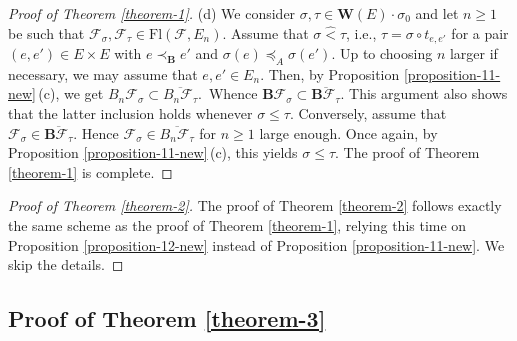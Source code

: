 \documentclass[12pt]{amsart}
\theoremstyle{definition}
\begin{document}
\begin{proof}[Proof of Theorem \ref{theorem-1}]
{\rm (d)}
We consider $\sigma,\tau\in\mathbf{W}(E)\cdot\sigma_0$
and let $n\geq 1$ be such that $\mathcal{F}_\sigma,\mathcal{F}_\tau\in\mathrm{Fl}(\mathcal{F},E_n)$.
Assume that $\sigma\hat{<}\tau$, i.e., $\tau=\sigma\circ t_{e,e'}$ for a pair $(e,e')\in E\times E$ with $e\prec_\mathbf{B}e'$ and $\sigma(e)\preceq_A\sigma(e')$. Up to choosing $n$ larger if necessary, we may assume that $e,e'\in E_n$. Then, by Proposition \ref{proposition-11-new}\,{\rm (c)}, we get $B_n\mathcal{F}_\sigma\subset\overline{B_n\mathcal{F}_\tau}$.\ Whence
$\mathbf{B}\mathcal{F}_\sigma\subset\overline{\mathbf{B}\mathcal{F}_\tau}$.
This argument also shows that the latter inclusion holds whenever $\sigma\leq\tau$.
Conversely, assume that $\mathcal{F}_\sigma\in\overline{\mathbf{B}\mathcal{F}_\tau}$.
Hence  $\mathcal{F}_\sigma\in\overline{B_n\mathcal{F}_\tau}$ for $n\geq 1$ large enough. Once again, by Proposition \ref{proposition-11-new}\,{\rm (c)}, this yields $\sigma\leq\tau$. The proof of Theorem \ref{theorem-1} is complete.
\end{proof}


\begin{proof}[Proof of Theorem \ref{theorem-2}]
The proof of Theorem \ref{theorem-2} follows exactly the same scheme as the proof of Theorem \ref{theorem-1}, relying this time on Proposition \ref{proposition-12-new} instead of Proposition \ref{proposition-11-new}.
We skip the details.
\end{proof}

\subsection{Proof of Theorem \ref{theorem-3}}

\label{section-5-5}
\end{document}
